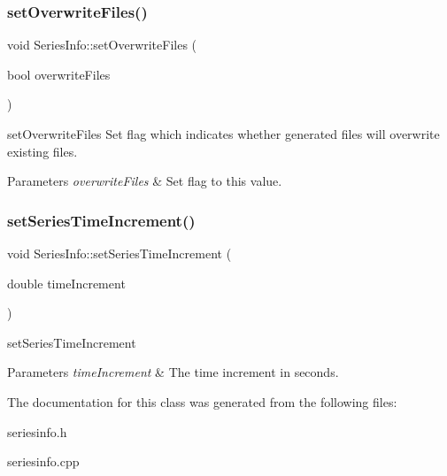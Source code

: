 \subsubsection{\texorpdfstring{set\+Overwrite\+Files()}{setOverwriteFiles()}}
{\footnotesize\ttfamily void Series\+Info\+::set\+Overwrite\+Files (\begin{DoxyParamCaption}\item[{bool}]{overwrite\+Files }\end{DoxyParamCaption})\hspace{0.3cm}{\ttfamily [inline]}}



set\+Overwrite\+Files Set flag which indicates whether generated files will overwrite existing files. 


\begin{DoxyParams}{Parameters}
{\em overwrite\+Files} & Set flag to this value. \\
\hline
\end{DoxyParams}
\mbox{\label{class_series_info_aacffddaa0cdb2dd931b89e57d429912e}} 
\subsubsection{\texorpdfstring{set\+Series\+Time\+Increment()}{setSeriesTimeIncrement()}}
{\footnotesize\ttfamily void Series\+Info\+::set\+Series\+Time\+Increment (\begin{DoxyParamCaption}\item[{double}]{time\+Increment }\end{DoxyParamCaption})\hspace{0.3cm}{\ttfamily [inline]}}



set\+Series\+Time\+Increment 


\begin{DoxyParams}{Parameters}
{\em time\+Increment} & The time increment in seconds. \\
\hline
\end{DoxyParams}


The documentation for this class was generated from the following files\+:\begin{DoxyCompactItemize}
\item 
seriesinfo.\+h\item 
seriesinfo.\+cpp\end{DoxyCompactItemize}
